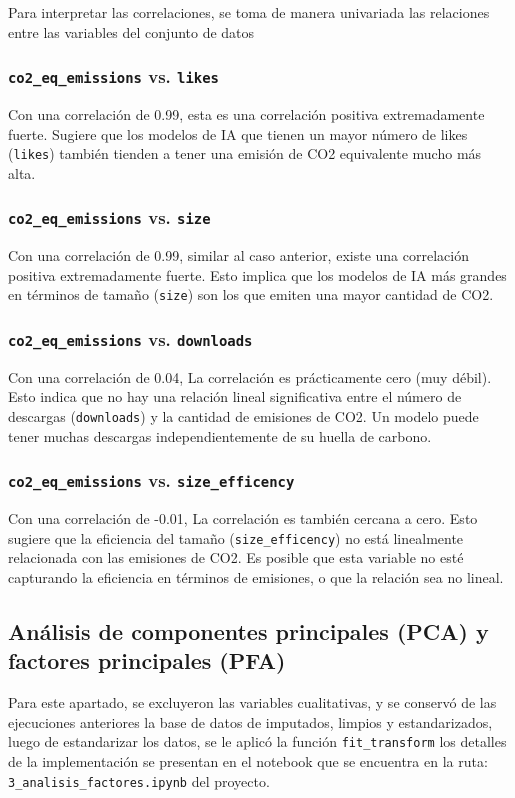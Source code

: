 \documentclass[journal]{IEEEtran}
\begin{document}
	Para interpretar las correlaciones, se toma de manera univariada las relaciones entre las variables del conjunto de datos
	\subsubsection{\texttt{co2\_eq\_emissions} vs. \texttt{likes}}

	Con una correlación de 0.99, esta es una correlación positiva extremadamente fuerte. Sugiere que los modelos de IA que tienen un mayor número de likes
	(\texttt{likes}) también tienden a tener una emisión de CO2 equivalente mucho más alta.
	\subsubsection{\texttt{co2\_eq\_emissions} vs. \texttt{size}}
	Con una correlación de 0.99, similar al caso anterior, existe una correlación positiva extremadamente fuerte. Esto implica que los modelos de IA más grandes en términos de tamaño (\texttt{size}) son los que emiten una mayor cantidad de CO2.

	\subsubsection{\texttt{co2\_eq\_emissions} vs. \texttt{downloads}}
	Con una correlación de 0.04, La correlación es prácticamente cero (muy débil). Esto indica que no hay una relación lineal significativa entre el número de descargas (\texttt{downloads}) y la cantidad de emisiones de CO2. Un modelo puede tener muchas descargas independientemente de su huella de carbono.

	\subsubsection{\texttt{co2\_eq\_emissions} vs. \texttt{size\_efficency}}
	Con una correlación de -0.01, La correlación es también cercana a cero. Esto sugiere que la eficiencia del tamaño (\texttt{size\_efficency}) no está linealmente relacionada con las emisiones de CO2. Es posible que esta variable no esté capturando la eficiencia en términos de emisiones, o que la relación sea no lineal.

	\subsection{Análisis de componentes principales (PCA) y factores principales (PFA)}
	Para este apartado, se excluyeron las variables cualitativas, y se conservó de las ejecuciones anteriores la base de datos de imputados, limpios y estandarizados, luego de estandarizar los datos, se le aplicó la función \texttt{fit\_transform} los detalles de la implementación se presentan en el notebook que se encuentra en la ruta: \texttt{3\_analisis\_factores.ipynb} del proyecto.
\end{document}

